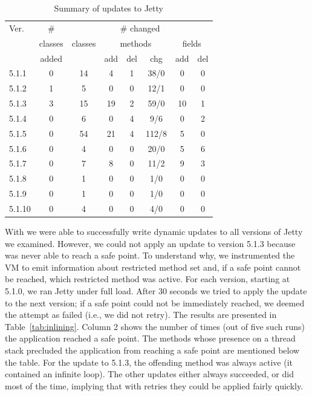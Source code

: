 \newcommand{\ChangedClassesColumn}{third}
\begin{table}
\begin{footnotesize}
\begin{center}
\begin{tabular}{|l||c||c|c|c|c|c|c|} \hline
Ver.    & \#      & \multicolumn{6}{c|}{\# changed} \\
        & classes & classes & \multicolumn{3}{c|}{methods} & \multicolumn{2}{c|}{fields} \\
        & added   &         & add & del & chg              & add & del \\ \hline \hline
5.1.1   & 0       & 14      & 4   & 1   & 38/0             & 0   & 0   \\
5.1.2   & 1       & 5       & 0   & 0   & 12/1             & 0   & 0   \\
5.1.3   & 3       & 15      & 19  & 2   & 59/0             & 10  & 1   \\
5.1.4   & 0       & 6       & 0   & 4   & 9/6              & 0   & 2   \\
5.1.5   & 0       & 54      & 21  & 4   & 112/8            & 5   & 0   \\
5.1.6   & 0       & 4       & 0   & 0   & 20/0             & 5   & 6   \\
5.1.7   & 0       & 7       & 8   & 0   & 11/2             & 9   & 3   \\
5.1.8   & 0       & 1       & 0   & 0   & 1/0              & 0   & 0   \\
5.1.9   & 0       & 1       & 0   & 0   & 1/0              & 0   & 0   \\
5.1.10  & 0       & 4       & 0   & 0   & 4/0              & 0   & 0   \\ \hline
\end{tabular}
\end{center}
\end{footnotesize}
\caption{Summary of updates to Jetty}
\label{tab:jetty-changes}
\end{table}

With \DSU{} we were able to successfully write dynamic updates to all
versions of Jetty we examined.  However, we could not apply an update
to version 5.1.3 because \DSU{} was never able to reach a safe point.
To understand why, we instrumented the VM to emit information about
restricted method set and, if a safe point cannot be reached, which
restricted method was active.  For each version, starting at 5.1.0, we
ran Jetty under full load.  After 30 seconds we tried to apply the
update to the next version; if a safe point could not be immediately
reached, we deemed the attempt as failed (i.e., we did not retry).  
The results are presented in
Table~\ref{tab:inlining}.  Column 2 shows the number of times (out of
five such runs) the application reached a safe point.  The methods
whose presence on a thread stack precluded the application from
reaching a safe point are mentioned below the table.  For the update
to 5.1.3, the offending method was always
active (it contained an infinite loop).  The other updates either
always succeeded, or did most of the time, implying that with retries
they could be applied fairly quickly.

